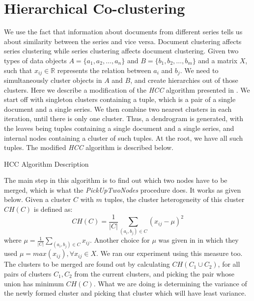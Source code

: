 \documentclass[11pt]{article}
\begin{document}
\section{Hierarchical Co-clustering}
We use the fact that information about documents from different series tells us about similarity between the series and vice versa. Document clustering affects series clustering while series clustering affects  document clustering.
Given two types of data objects $A=\{a_1,a_2,\ldots,a_n\}$ and $B=\{b_1,b_2,\ldots,b_m\}$ and a matrix $X$, such that $x_{ij} \in \mathbb{R}$ represents the relation between $a_i$ and $b_j$. We need to simultaneously cluster objects in $A$ and $B$, and create hierarchies out of those clusters.
Here we describe a modification of the \emph{HCC} algorithm presented in \cite{HCC1}.
We start off with singleton clusters containing a tuple, which is a pair of a single document and a single series. We then combine two nearest clusters in each iteration, until there is only one cluster. Thus, a dendrogram is generated, with the leaves being tuples containing a single document and a single series, and internal nodes containing a cluster of such tuples. At the root, we have all such tuples.
The modified \emph{HCC} algorithm is described below.
\begin{algorithm}[H]
  \caption{HCC Algorithm Description}
  \label{hcc_algo}
  \begin{algorithmic}
    \ENDFOR
  \end{algorithmic}
\end{algorithm}
The main step in this algorithm is to find out which two nodes have to be merged, which is what the \emph{PickUpTwoNodes} procedure does. It works as given below.
Given a cluster $C$ with $m$ tuples, the cluster heterogeneity of this cluster $CH(C)$ is defined as:
\begin{displaymath}
  CH(C)=\frac{1}{|C|}\sum_{(a_i,b_j) \in C}(x_{ij}-\mu)^2
\end{displaymath}
where $\mu=\frac{1}{|C|}\sum_{(a_i,b_j) \in C}x_{ij}$.
Another choice for $\mu$ was given in \cite{HCC2} in which they used $\mu=max(x_{ij}), \forall x_{ij} \in X$. We ran our experiment using this measure too.\\
The clusters to be merged are found out by calculating $CH(C_1 \cup C_2)$, for all pairs of clusters $C_1,C_2$ from the current clusters, and picking the pair whose union has minimum $CH(C)$. What we are doing is determining the variance of the newly formed cluster and picking that cluster which will have least variance.\\
\end{document}
